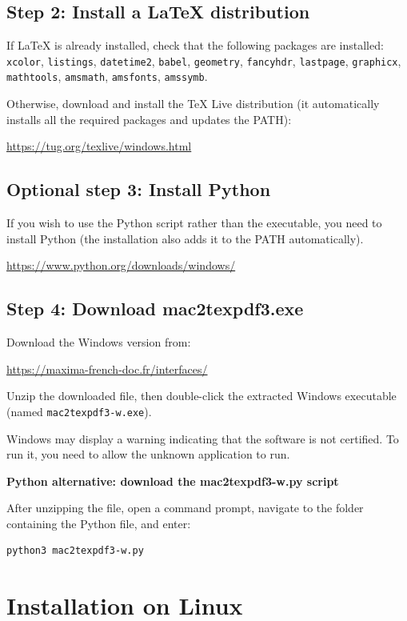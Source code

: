 \documentclass[a4paper,11pt]{article}
\begin{document}
\subsection*{Step 2: Install a \LaTeX{} distribution}
If \LaTeX{} is already installed, check that the following packages are installed: \texttt{xcolor}, \texttt{listings}, \texttt{datetime2}, \texttt{babel}, \texttt{geometry}, \texttt{fancyhdr}, \texttt{lastpage}, \texttt{graphicx}, \texttt{mathtools}, \texttt{amsmath}, \texttt{amsfonts}, \texttt{amssymb}.

Otherwise, download and install the TeX Live distribution (it automatically installs all the required packages and updates the PATH):
\begin{center}
\url{https://tug.org/texlive/windows.html}
\end{center}

\subsection*{Optional step 3: Install Python}
If you wish to use the Python script rather than the executable, you need to install Python (the installation also adds it to the PATH automatically).
\begin{center}
\url{https://www.python.org/downloads/windows/}
\end{center}

\subsection*{Step 4: Download mac2texpdf3.exe}
Download the Windows version from:
\begin{center}
\url{https://maxima-french-doc.fr/interfaces/}
\end{center}
Unzip the downloaded file, then double-click the extracted Windows executable (named \texttt{mac2texpdf3-w.exe}).

Windows may display a warning indicating that the software is not certified. To run it, you need to allow the unknown application to run.

\textbf{Python alternative: download the mac2texpdf3-w.py script}

After unzipping the file, open a command prompt, navigate to the folder containing the Python file, and enter:
\begin{verbatim}
python3 mac2texpdf3-w.py
\end{verbatim}

\section*{Installation on Linux}
\end{document}
